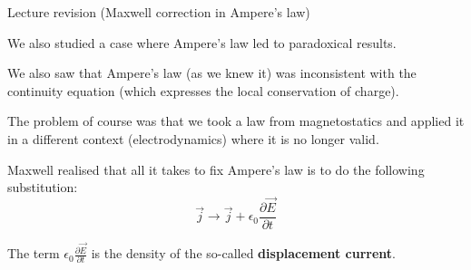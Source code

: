 \begin{frame}{Lecture \summarizedlecture revision (Maxwell correction in Ampere's law)}

We also studied a case where Ampere's law led to paradoxical results.\\

\vspace{0.2cm}

We also saw that Ampere's law (as we knew it) was inconsistent with
the continuity equation (which expresses the local conservation of charge).\\

\vspace{0.2cm}

The problem of course was that we took a law from magnetostatics and
applied it in a different context (electrodynamics) where it is no longer valid.

\vspace{0.2cm}

Maxwell realised that all it takes to fix Ampere's law is to do the following substitution:
\begin{equation*}
  \vec{j} \rightarrow
  \vec{j} + \epsilon_0 \frac{\partial \vec{E}}{\partial t}
\end{equation*}

The term $\displaystyle \epsilon_0 \frac{\partial \vec{E}}{\partial t}$ is the
density of the so-called {\bf displacement current}.

\end{frame}

%
%
%

